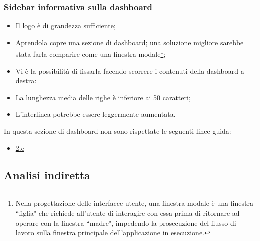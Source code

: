\subsubsection{Sidebar informativa sulla dashboard}
\begin{itemize}
    \item Il logo è di grandezza sufficiente;
    \item Aprendola copre una sezione di dashboard; una soluzione migliore sarebbe stata farla comparire come una finestra modale\footnote{Nella progettazione delle interfacce utente, una finestra modale è una finestra ``figlia" che richiede all'utente di interagire con essa prima di ritornare ad operare con la finestra ``madre", impedendo la prosecuzione del flusso di lavoro sulla finestra principale dell'applicazione in esecuzione.};
    \item Vi è la possibilità di fissarla facendo scorrere i contenuti della dashboard a destra:
    \item La lunghezza media delle righe è inferiore ai 50 caratteri;
    \item L'interlinea potrebbe essere leggermente aumentata.
\end{itemize}
In questa sezione di dashboard non sono rispettate le seguenti linee guida:
\begin{itemize}
    \item \hyperref[lg:2.e]{2.e}
\end{itemize}

\subsection{Analisi indiretta}
